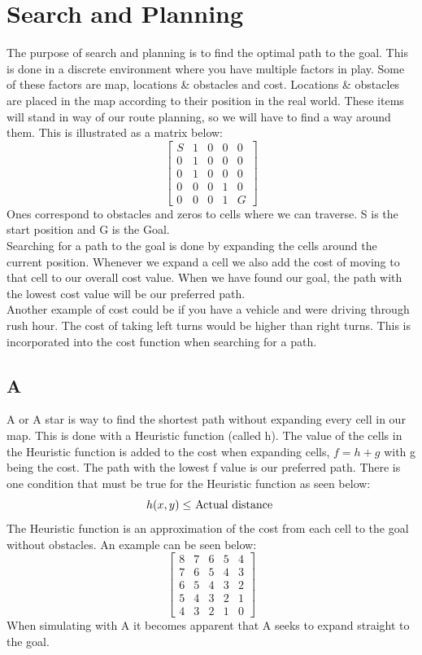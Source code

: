 \section{Search and Planning}
The purpose of search and planning is to find the optimal path to the goal. This is done in a discrete environment where you have multiple factors in play. Some of these factors are map, locations \& obstacles and cost. Locations \& obstacles are placed in the map according to their position in the real world. These items will stand in way of our route planning, so we will have to find a way around them. This is illustrated as a matrix below:
\[
\begin{bmatrix}
S & 1 & 0 & 0 & 0\\ 
0 & 1 & 0 & 0 & 0\\ 
0 & 1 & 0 & 0 & 0\\ 
0 & 0 & 0 & 1 & 0\\ 
0 & 0 & 0 & 1 & G
\end{bmatrix}
\]
Ones correspond to obstacles and zeros to cells where we can traverse. S is the start position and G is the Goal.\\
Searching for a path to the goal is done by expanding the cells around the current position. Whenever we expand a cell we also add the cost of moving to that cell to our overall cost value. When we have found our goal, the path with the lowest cost value will be our preferred path.\\
Another example of cost could be if you have a vehicle and were driving through rush hour. The cost of taking left turns would be higher than right turns. This is incorporated into the cost function when searching for a path.\\

\subsection{A\text{*}}
A\text{*} or A star is way to find the shortest path without expanding every cell in our map. This is done with a Heuristic function (called h). The value of the cells in the Heuristic function is added to the cost when expanding cells, $f = h + g$ with g being the cost. The path with the lowest f value is our preferred path. There is one condition that must be true for the Heuristic function as seen below:
\begin{equation}
h(x,y)\leq$ Actual distance $
\end{equation}
The Heuristic function is an approximation of the cost from each cell to the goal without obstacles. An example can be seen below:
\[
\begin{bmatrix}
8 & 7 & 6 & 5 & 4\\ 
7 & 6 & 5 & 4 & 3\\ 
6 & 5 & 4 & 3 & 2\\ 
5 & 4 & 3 & 2 & 1\\ 
4 & 3 & 2 & 1 & 0
\end{bmatrix}
\]
When simulating with A\text{*} it becomes apparent that A\text{*} seeks to expand straight to the goal.

